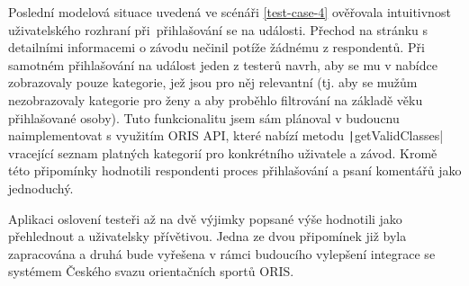 Poslední modelová situace uvedená ve scénáři \ref{test-case-4} ověřovala intuitivnost uživatelského rozhraní při~přihlašování se na události. Přechod na stránku s detailními informacemi o závodu nečinil potíže žádnému z respondentů. Při samotném přihlašování na událost jeden z testerů navrh, aby se mu v nabídce zobrazovaly pouze kategorie, jež jsou pro něj relevantní (tj. aby se mužům nezobrazovaly kategorie pro ženy a aby proběhlo filtrování na základě věku přihlašované osoby). Tuto funkcionalitu jsem sám plánoval v budoucnu naimplementovat s využitím ORIS API, které nabízí metodu \texttt|getValidClasses| vracející seznam platných kategorií pro konkrétního uživatele a závod. Kromě této připomínky hodnotili respondenti proces přihlašování a psaní komentářů jako jednoduchý.

Aplikaci oslovení testeři až na dvě výjimky popsané výše hodnotili jako přehlednout a uživatelsky přívětivou. Jedna ze dvou připomínek již byla zapracována a druhá bude vyřešena v rámci budoucího vylepšení integrace se systémem Českého svazu orientačních sportů ORIS.
